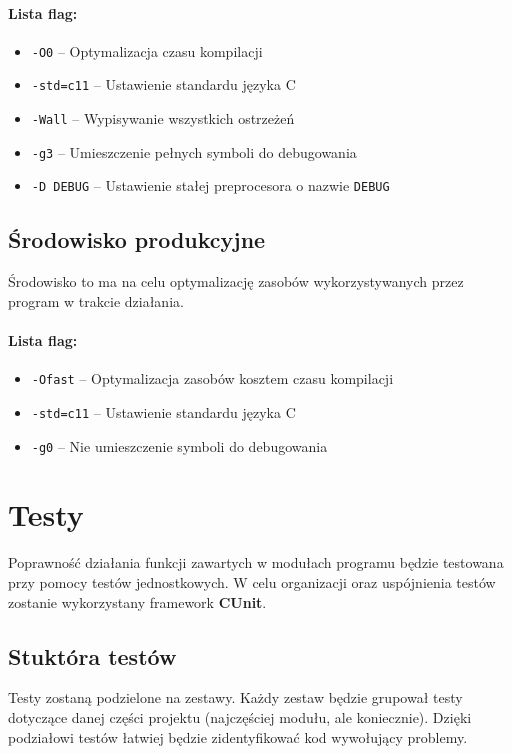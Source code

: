\documentclass{article}
\begin{document}
\paragraph{Lista flag:}
\begin{itemize}
	\item \texttt{-O0} -- Optymalizacja czasu kompilacji
	\item \texttt{-std=c11} -- Ustawienie standardu języka C
	\item \texttt{-Wall} -- Wypisywanie wszystkich ostrzeżeń
	\item \texttt{-g3} -- Umieszczenie pełnych symboli do debugowania
	\item \texttt{-D DEBUG} -- Ustawienie stałej preprocesora o nazwie \texttt{DEBUG}
\end{itemize}

\subsection{Środowisko produkcyjne}
Środowisko to ma na celu optymalizację zasobów wykorzystywanych przez program w trakcie działania.

\paragraph{Lista flag:}
\begin{itemize}
	\item \texttt{-Ofast} -- Optymalizacja zasobów kosztem czasu kompilacji
	\item \texttt{-std=c11} -- Ustawienie standardu języka C
	\item \texttt{-g0} -- Nie umieszczenie symboli do debugowania
\end{itemize}

\section{Testy}
Poprawność działania funkcji zawartych w modułach programu będzie testowana przy pomocy testów jednostkowych. W celu organizacji oraz uspójnienia testów zostanie wykorzystany framework \textbf{CUnit}.

\subsection{Stuktóra testów}
Testy zostaną podzielone na zestawy. Każdy zestaw będzie grupował testy dotyczące danej części projektu (najczęściej modułu, ale koniecznie). Dzięki podziałowi testów łatwiej będzie zidentyfikować kod wywołujący problemy.
\end{document}
